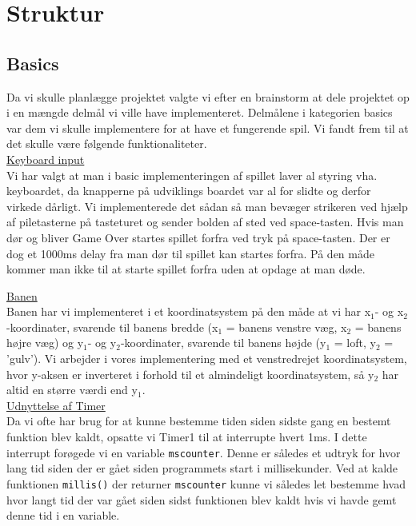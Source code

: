 \chapter{Struktur}

\section{Basics}
Da vi skulle planlægge projektet valgte vi efter en brainstorm at dele projektet op i en mængde delmål vi ville have implementeret. Delmålene i kategorien basics var dem vi skulle implementere for at have et fungerende spil. Vi fandt frem til at det skulle være følgende funktionaliteter.\\

\underline{Keyboard input}\\

Vi har valgt at man i basic implementeringen af spillet laver al styring vha. keyboardet, da knapperne på udviklings boardet var al for slidte og derfor virkede dårligt. Vi implementerede det sådan så man bevæger strikeren ved hjælp af piletasterne på tasteturet og sender bolden af sted ved space-tasten. Hvis man dør og bliver Game Over startes spillet forfra ved tryk på space-tasten. Der er dog et 1000ms delay fra man dør til spillet kan startes forfra. På den måde kommer man ikke til at starte spillet forfra uden at opdage at man døde.\\
\newpage

\underline{Banen}\\

Banen har vi implementeret i et koordinatsystem på den måde at vi har  x$_{1}$- og x$_{2}$-koordinater, svarende til banens bredde (x$_{1}$ = banens venstre væg, x$_{2}$ = banens højre væg) og y$_{1}$- og y$_{2}$-koordinater, svarende til banens højde (y$_{1}$ = loft, y$_{2}$ = 'gulv'). Vi arbejder i vores implementering med et venstredrejet koordinatsystem, hvor y-aksen er inverteret i forhold til et almindeligt koordinatsystem, så y$_{2}$ har altid en større værdi end y$_{1}$.\\

\underline{Udnyttelse af Timer}\\

Da vi ofte har brug for at kunne bestemme tiden siden sidste gang en bestemt funktion blev kaldt, opsatte vi Timer1 til at interrupte hvert 1ms. I dette interrupt forøgede vi en variable \texttt{mscounter}. Denne er således et udtryk for hvor lang tid siden der er gået siden programmets start i millisekunder. Ved at kalde funktionen \texttt{millis()} der returner \texttt{mscounter} kunne vi således let bestemme hvad hvor langt tid der var gået siden sidst funktionen blev kaldt hvis vi havde gemt denne tid i en variable.\\

